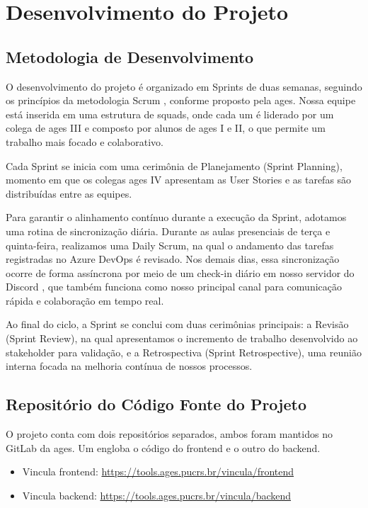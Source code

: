 \section[Desenvolvimento do Projeto]{Desenvolvimento do Projeto}

\subsection{Metodologia de Desenvolvimento}
  O desenvolvimento do projeto é organizado em Sprints de duas semanas, seguindo os princípios da metodologia Scrum \cite{scrum}, conforme proposto pela \acs{ages}. Nossa equipe está inserida em uma estrutura de squads, onde cada um é liderado por um colega de \acs{ages} III e composto por alunos de \acs{ages} I e II, o que permite um trabalho mais focado e colaborativo.

  Cada Sprint se inicia com uma cerimônia de Planejamento (Sprint Planning), momento em que os colegas \acs{ages} IV apresentam as User Stories e as tarefas são distribuídas entre as equipes.

  Para garantir o alinhamento contínuo durante a execução da Sprint, adotamos uma rotina de sincronização diária. Durante as aulas presenciais de terça e quinta-feira, realizamos uma Daily Scrum, na qual o andamento das tarefas registradas no Azure DevOps \cite{azuredevops} é revisado. Nos demais dias, essa sincronização ocorre de forma assíncrona por meio de um check-in diário em nosso servidor do Discord \cite{discord}, que também funciona como nosso principal canal para comunicação rápida e colaboração em tempo real.

  Ao final do ciclo, a Sprint se conclui com duas cerimônias principais: a Revisão (Sprint Review), na qual apresentamos o incremento de trabalho desenvolvido ao stakeholder para validação, e a Retrospectiva (Sprint Retrospective), uma reunião interna focada na melhoria contínua de nossos processos.

\subsection{Repositório do Código Fonte do Projeto}
  O projeto conta com dois repositórios separados, ambos foram mantidos no GitLab da \ac{ages}. Um engloba o código do frontend e o outro do backend.
  
    \begin{itemize}
      \item Vincula frontend: \url{https://tools.ages.pucrs.br/vincula/frontend}
      \item Vincula backend: \url{https://tools.ages.pucrs.br/vincula/backend}
    \end{itemize}

